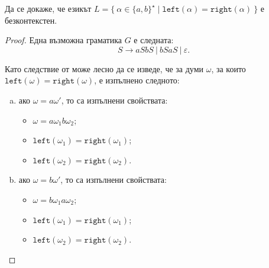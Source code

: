 \begin{framed}
  \begin{problem}\label{prob:equal-number-parentheses}
    Да се докаже, че езикът $L = \{\ \alpha \in \{a,b\}^\star\mid \texttt{left}(\alpha) = \texttt{right}(\alpha)\ \}$
    е безконтекстен.
  \end{problem}  
\end{framed}
\begin{proof}
  Една възможна граматика $G$ е следната: 
  \[S \to a  S b S\ |\ b S a S\ |\ \varepsilon.\]
  
  Като следствие от  може лесно да се изведе, че за думи $\omega$, за които $\texttt{left}(\omega) = \texttt{right}(\omega)$,
  е изпълнено следното:
  \begin{enumerate}[a)]
  \item 
    ако $\omega = a\omega'$, то са изпълнени свойствата:
    \begin{itemize}
    \item 
      $\omega = a \omega_1 b \omega_2$;
    \item
      $\texttt{left}(\omega_1) = \texttt{right}(\omega_1)$;
    \item
      $\texttt{left}(\omega_2) = \texttt{right}(\omega_2)$.
    \end{itemize}
  \item
    ако $\omega = b \omega'$, то са изпълнени свойствата:
    \begin{itemize}
    \item 
      $\omega = b \omega_1 a \omega_2$;
    \item
      $\texttt{left}(\omega_1) = \texttt{right}(\omega_1)$;
    \item
      $\texttt{left}(\omega_2) = \texttt{right}(\omega_2)$.
    \end{itemize}
  \end{enumerate}


\end{proof}
